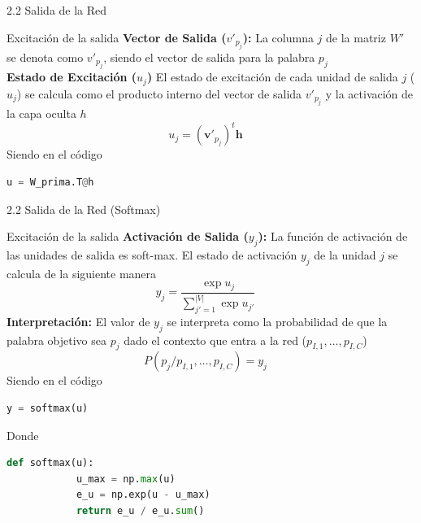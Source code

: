 \documentclass{beamer}
\begin{document}
\begin{frame}[fragile]{2.2 Salida de la Red}
	\begin{block}{Excitación de la salida}
\justifying
\textbf{ Vector de Salida ($v'_{p_j}$):} La columna $j$ de la matriz $W'$ se denota como $v'_{p_j}$, siendo el vector de salida para la palabra $p_j$\\
\vspace{0.3cm}
\textbf{Estado de Excitación ($u_j$)} El estado de excitación de cada unidad de salida $j$ ($u_j$) se calcula como el producto interno del vector de salida $v'_{p_j}$ y la activación de la capa oculta $h$\\
$$u_j = (\mathbf{v}'_{p_j})^t \mathbf{h} \quad$$
Siendo en el código
\begin{lstlisting}[language=Python]
	u = W_prima.T@h
\end{lstlisting}
	\end{block}
\end{frame}
	
	
\begin{frame}[fragile]{2.2 Salida de la Red (Softmax)}
	\begin{block}{Excitación de la salida}
		\justifying
		\textbf{ Activación de Salida ($y_j$):} La función de activación de las unidades de salida es soft-max. El estado de activación $y_j$ de la unidad $j$ se calcula de la siguiente manera\\
		$$y_j = \frac{\exp u_j}{\sum_{j'=1}^{|V|} \exp u_{j'}} \quad$$
		\vspace{0.3cm}
		\textbf{ Interpretación:} El valor de $y_j$ se interpreta como la probabilidad de que la palabra objetivo sea $p_j$ dado el contexto que entra a la red ($p_{I,1}, \dots, p_{I,C}$)\\
		$$P(p_j/p_{I,1}, \dots, p_{I,C}) = y_j \quad$$
		Siendo en el código
		\begin{lstlisting}[language=Python]
			y = softmax(u)
		\end{lstlisting}
		Donde 
				\begin{lstlisting}[language=Python]
		def softmax(u):
			u_max = np.max(u)
			e_u = np.exp(u - u_max)
			return e_u / e_u.sum()
		\end{lstlisting}
	\end{block}
\end{frame}
	
\end{document}
